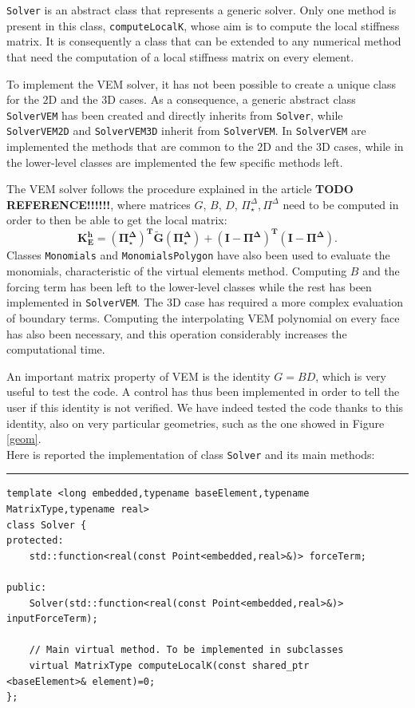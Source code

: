\verb|Solver| is an abstract class that represents a generic solver. Only one method is present in this class, \verb|computeLocalK|, whose aim is to compute the local stiffness matrix. It is consequently a class that can be extended to any numerical method that need the computation of a local stiffness matrix on every element. 

To implement the VEM solver, it has not been possible to create a unique class for the $2$D and the $3$D cases. As a consequence, a generic abstract class \verb|SolverVEM| has been created and directly inherits from \verb|Solver|, while \verb|SolverVEM2D| and \verb|SolverVEM3D| inherit from \verb|SolverVEM|. In \verb|SolverVEM| are implemented the methods that are common to the $2$D and the $3$D cases, while in the lower-level classes are implemented the few specific methods left. 

The VEM solver follows the procedure explained in the article \textbf{TODO REFERENCE!!!!!!}, where matrices $G$, $B$, $D$, $\Pi_\star^\Delta,\Pi^\Delta$ need to be computed in order to then be able to get the local matrix:
$$ \mathbf{K_E^h= (\Pi^\Delta_\star)^T \tilde{G}
  (\Pi^\Delta_\star)+(I-\Pi^\Delta)^T (I-\Pi^\Delta)}. $$ 
Classes \verb|Monomials| and \verb|MonomialsPolygon| have also been used to evaluate the monomials, characteristic of the virtual elements method. Computing $B$ and the forcing term has been left to the lower-level classes while the rest has been implemented in \verb|SolverVEM|. The $3$D case has required a more complex evaluation of boundary terms. Computing the interpolating VEM polynomial on every face has also been necessary, and this operation considerably increases the computational time. 

An important matrix property of VEM is the identity $G = BD$, which is very useful to test the code. A control has thus been implemented in order to tell the user if this identity is not verified. We have indeed tested the code thanks to this identity, also on very particular geometries, such as the one showed in Figure \ref{geom}. \\

Here is reported the implementation of class \verb|Solver| and its main methods:

\noindent\rule{12.7cm}{1pt}
\begin{lstlisting}[caption=File \texttt{Solver.h}]
template <long embedded,typename baseElement,typename 
MatrixType,typename real>
class Solver {
protected:
    std::function<real(const Point<embedded,real>&)> forceTerm;
	
public:
    Solver(std::function<real(const Point<embedded,real>&)> 
inputForceTerm);

    // Main virtual method. To be implemented in subclasses
    virtual MatrixType computeLocalK(const shared_ptr
<baseElement>& element)=0;
};
\end{lstlisting}

